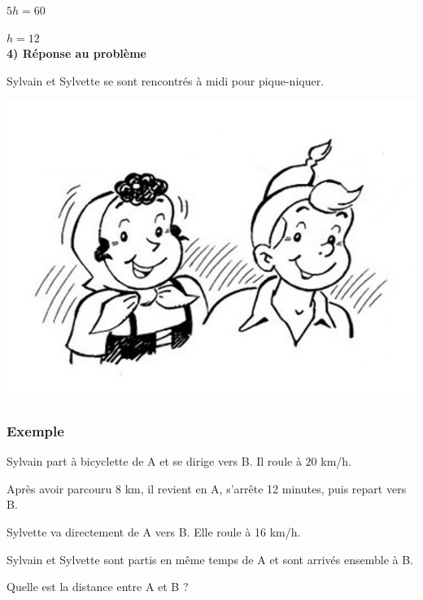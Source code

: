 $ 5h = 60 $

$ h = 12 $ \\

\textbf{4) Réponse au problème}

Sylvain et Sylvette se sont rencontrés à midi pour pique-niquer.

\centerline{\includegraphics[width=.6\textwidth]{Sylvain+Sylvette_NB.jpg}} 
\newpage

\subsubsection{Exemple }

Sylvain part à bicyclette de A et se dirige vers B. Il roule à $20$ km/h.



Après avoir parcouru 8 km, il revient en A, s'arrête 12 minutes, puis repart vers B.

Sylvette va directement de A vers B. Elle roule à 16 km/h.

Sylvain et Sylvette sont partis en même temps de A et sont arrivés ensemble à B.

Quelle est la distance entre A et B ? 




